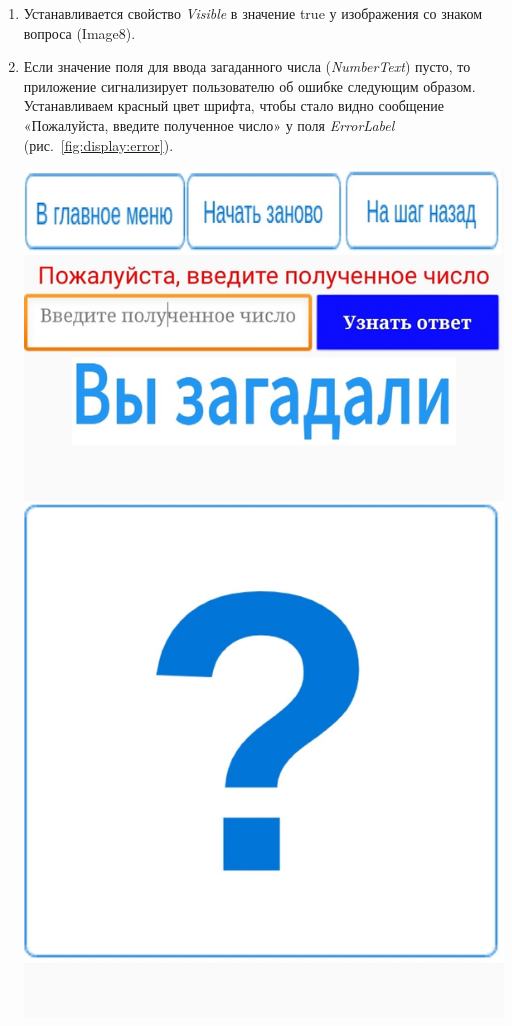 \begin{enumerate}
  \item Устанавливается свойство \textit{Visible} в значение true у изображения со знаком вопроса (Image8).
  \item Если значение поля для ввода загаданного числа (\textit{NumberText}) пусто, то приложение сигнализирует пользователю об ошибке следующим образом. Устанавливаем красный цвет шрифта, чтобы стало видно сообщение «Пожалуйста, введите полученное число» у поля \textit{ErrorLabel} (рис.~\ref{fig:display:error}).
  \begin{marginfigure}[2em]
    \includegraphics{./graphics/programs/guess_numbers/finalScreen_Error2_TheGuessingNumbersGame_AppInventor.jpg}

\end{marginfigure}
\end{enumerate}
